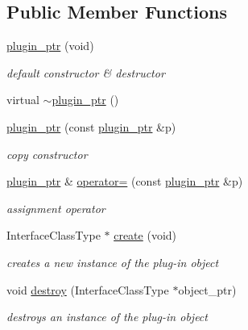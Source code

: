 \subsection*{Public Member Functions}
\begin{DoxyCompactItemize}
\item 
\hyperlink{classpion_1_1plugin__ptr_a3fb9fad6bdaee03c90651b46564075a1}{plugin\-\_\-ptr} (void)
\begin{DoxyCompactList}\small\item\em default constructor \& destructor \end{DoxyCompactList}\item 
virtual \hyperlink{classpion_1_1plugin__ptr_af280950ca15e43dc37d2aa07c2651bdb}{$\sim$plugin\-\_\-ptr} ()
\item 
\hyperlink{classpion_1_1plugin__ptr_ab79c8e53cd10a3471f0ff68651c1514b}{plugin\-\_\-ptr} (const \hyperlink{classpion_1_1plugin__ptr}{plugin\-\_\-ptr} \&p)
\begin{DoxyCompactList}\small\item\em copy constructor \end{DoxyCompactList}\item 
\hyperlink{classpion_1_1plugin__ptr}{plugin\-\_\-ptr} \& \hyperlink{classpion_1_1plugin__ptr_af86e0fd368c1b60a471b9e107f829f27}{operator=} (const \hyperlink{classpion_1_1plugin__ptr}{plugin\-\_\-ptr} \&p)
\begin{DoxyCompactList}\small\item\em assignment operator \end{DoxyCompactList}\item 
Interface\-Class\-Type $\ast$ \hyperlink{classpion_1_1plugin__ptr_abbe4fd78867b4a9dcae2245e54f47b55}{create} (void)
\begin{DoxyCompactList}\small\item\em creates a new instance of the plug-\/in object \end{DoxyCompactList}\item 
void \hyperlink{classpion_1_1plugin__ptr_a0f128cd11b09e603dc8cd8d86a6f6824}{destroy} (Interface\-Class\-Type $\ast$object\-\_\-ptr)
\begin{DoxyCompactList}\small\item\em destroys an instance of the plug-\/in object \end{DoxyCompactList}\end{DoxyCompactItemize}
